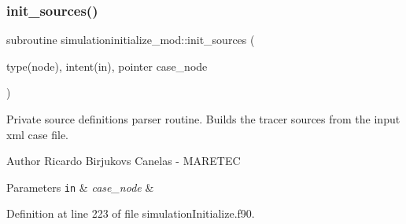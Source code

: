 \subsubsection{\texorpdfstring{init\+\_\+sources()}{init\_sources()}}
{\footnotesize\ttfamily subroutine simulationinitialize\+\_\+mod\+::init\+\_\+sources (\begin{DoxyParamCaption}\item[{type(node), intent(in), pointer}]{case\+\_\+node }\end{DoxyParamCaption})\hspace{0.3cm}{\ttfamily [private]}}



Private source definitions parser routine. Builds the tracer sources from the input xml case file. 

\begin{DoxyAuthor}{Author}
Ricardo Birjukovs Canelas -\/ M\+A\+R\+E\+T\+EC 
\end{DoxyAuthor}

\begin{DoxyParams}[1]{Parameters}
\mbox{\tt in}  & {\em case\+\_\+node} & \\
\hline
\end{DoxyParams}


Definition at line 223 of file simulation\+Initialize.\+f90.


